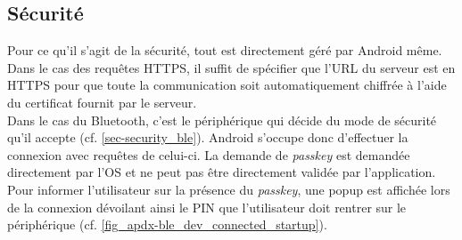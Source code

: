 \subsection{Sécurité}


Pour ce qu'il s'agit de la sécurité, tout est directement géré par Android même. Dans le cas des requêtes HTTPS, il suffit de spécifier que l'URL du serveur est en HTTPS pour que toute la communication soit automatiquement chiffrée à l'aide du certificat fournit par le serveur. \\

Dans le cas du Bluetooth, c'est le périphérique qui décide du mode de sécurité qu'il accepte (cf. \cref{sec-security_ble}). Android s'occupe donc d'effectuer la connexion avec requêtes de celui-ci. La demande de \textit{passkey} est demandée directement par l'OS et ne peut pas être directement validée par l'application. Pour informer l'utilisateur sur la présence du \textit{passkey}, une popup est affichée lors de la connexion dévoilant ainsi le PIN que l'utilisateur doit rentrer sur le périphérique (cf. \cref{fig_apdx-ble_dev_connected_startup}).

